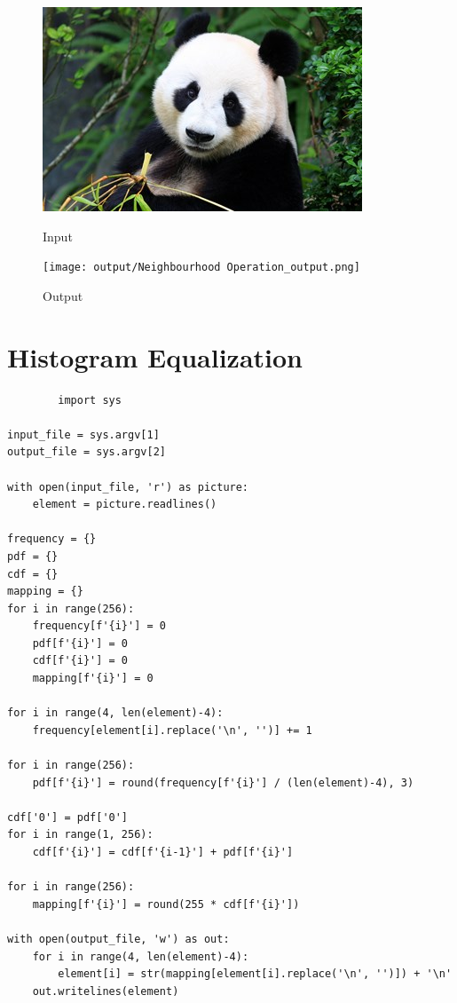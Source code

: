 \documentclass[a4paper,8pt]{article}
\begin{document}
        \begin{figure}[H]
        \centering
        \begin{minipage}{0.4\linewidth}
        \centering
        \includegraphics[width=\linewidth]{output/input1.jpg}
        \caption{Input}
        \end{minipage}
        \hfill
        \begin{minipage}{0.4\linewidth}
        \centering
        \texttt{[image: output/Neighbourhood Operation\_output.png]}
        \caption{Output}
        \end{minipage}
        \end{figure}
        \clearpage
        
        \section{Histogram Equalization}
        \begin{verbatim}
        import sys

input_file = sys.argv[1]
output_file = sys.argv[2]

with open(input_file, 'r') as picture:
    element = picture.readlines()

frequency = {}
pdf = {}
cdf = {}
mapping = {}
for i in range(256):
    frequency[f'{i}'] = 0
    pdf[f'{i}'] = 0
    cdf[f'{i}'] = 0
    mapping[f'{i}'] = 0
    
for i in range(4, len(element)-4):
    frequency[element[i].replace('\n', '')] += 1

for i in range(256):
    pdf[f'{i}'] = round(frequency[f'{i}'] / (len(element)-4), 3)

cdf['0'] = pdf['0']
for i in range(1, 256):
    cdf[f'{i}'] = cdf[f'{i-1}'] + pdf[f'{i}']

for i in range(256):
    mapping[f'{i}'] = round(255 * cdf[f'{i}'])

with open(output_file, 'w') as out:
    for i in range(4, len(element)-4):
        element[i] = str(mapping[element[i].replace('\n', '')]) + '\n'
    out.writelines(element)


        \end{verbatim}
        
\end{document}
